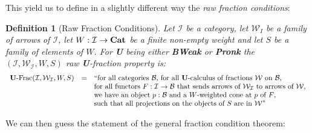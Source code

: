 \documentclass{article}
\numberwithin{equation}{section}
\theoremstyle{definition}
\theoremstyle{plain}
\newtheorem{definition}[equation]{Definition}
\newcommand{\Cat}{\textnormal{\textbf{Cat}}}
\begin{document}
This yield us to define in a slightly different way the \textit{raw fraction conditions}:

\begin{definition}[Raw Fraction Conditions] Let $\mathcal{I}$ be a category, let $\mathcal{W}_I$ be a family of arrows of $\mathcal{I}$, let $W: \mathcal{I} \to \Cat$ be a finite non-empty weight and let $S$ be a family of elements of $W$. For \textbf{U} being either \textbf{BWeak} or \textbf{Pronk} the $(\mathcal{I}, \mathcal{W}_{\mathcal{I}}, W, S)$ raw \textbf{U}-fraction property is: 
	\[\begin{array}{rcl}
		\textnormal{\textbf{U}-Frac}(\mathcal{I}, \mathcal{W}_{\mathcal{I}}, W, S) & = & \text{``for all categories $\mathcal{B}$, for all \textbf{U}-calculus of fractions $\mathcal{W}$ on $\mathcal{B}$,}  \\
		&& \text{for all functors $F: \mathcal{I} \to \mathcal{B}$ that sends arrows of $\mathcal{W}_{\mathcal{I}}$ to arrows of $\mathcal{W}$,}\\
		&& \text{we have an object $p:\mathcal{B}$ and a $W$-weighted cone at $p$ of $F$,}\\
		&& \text{such that all projections on the objects of $S$ are in $\mathcal{W}$''}
	\end{array}\]
\end{definition}

We can then guess the statement of the general fraction condition theorem:
\end{document}
